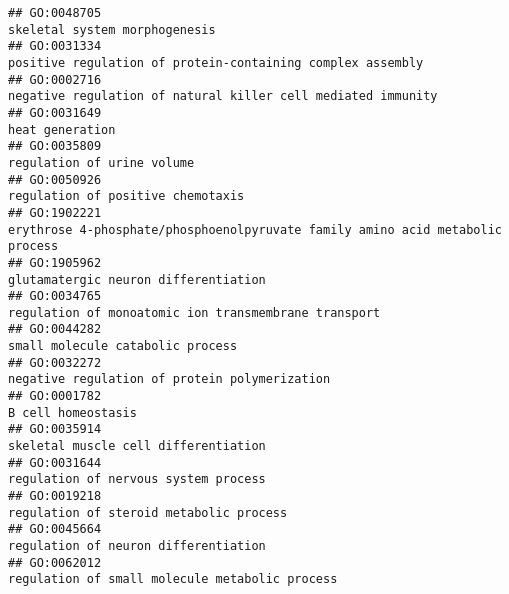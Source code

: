 \documentclass[
]{article}
\begin{document}
\begin{verbatim}
## GO:0048705                                                                                                                    skeletal system morphogenesis
## GO:0031334                                                                                       positive regulation of protein-containing complex assembly
## GO:0002716                                                                                     negative regulation of natural killer cell mediated immunity
## GO:0031649                                                                                                                                  heat generation
## GO:0035809                                                                                                                       regulation of urine volume
## GO:0050926                                                                                                                regulation of positive chemotaxis
## GO:1902221                                                                    erythrose 4-phosphate/phosphoenolpyruvate family amino acid metabolic process
## GO:1905962                                                                                                             glutamatergic neuron differentiation
## GO:0034765                                                                                             regulation of monoatomic ion transmembrane transport
## GO:0044282                                                                                                                 small molecule catabolic process
## GO:0032272                                                                                                    negative regulation of protein polymerization
## GO:0001782                                                                                                                               B cell homeostasis
## GO:0035914                                                                                                             skeletal muscle cell differentiation
## GO:0031644                                                                                                             regulation of nervous system process
## GO:0019218                                                                                                          regulation of steroid metabolic process
## GO:0045664                                                                                                             regulation of neuron differentiation
## GO:0062012                                                                                                   regulation of small molecule metabolic process

\end{verbatim}
\end{document}
